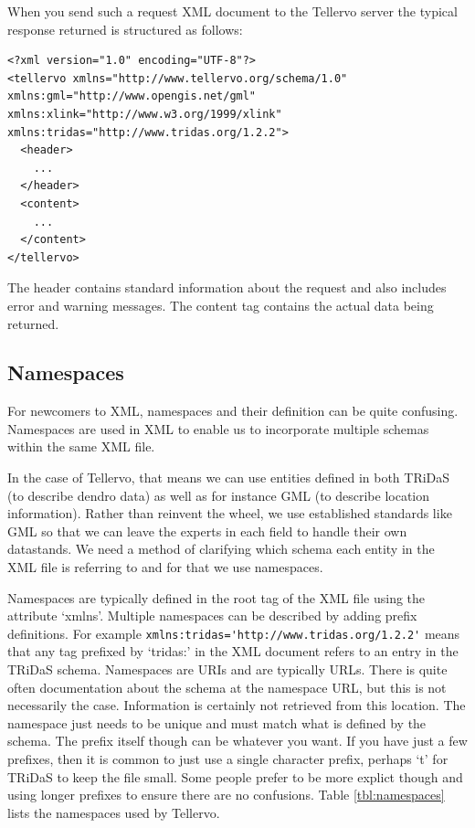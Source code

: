 When you send such a request XML document to the Tellervo server the typical response returned is structured as follows:

\begin{lstlisting}
<?xml version="1.0" encoding="UTF-8"?>
<tellervo xmlns="http://www.tellervo.org/schema/1.0" xmlns:gml="http://www.opengis.net/gml" xmlns:xlink="http://www.w3.org/1999/xlink" xmlns:tridas="http://www.tridas.org/1.2.2">
  <header>
    ...
  </header>
  <content>
    ...
  </content>
</tellervo>
\end{lstlisting}

The header contains standard information about the request and also includes error and warning messages.  The content tag contains the actual data being returned.

\subsection{Namespaces}
\label{txt:Namespaces}

For newcomers to XML, namespaces and their definition can be quite confusing. Namespaces are used in XML to enable us to incorporate multiple schemas within the same XML file.  

In the case of Tellervo, that means we can use entities defined in both TRiDaS (to describe dendro data) as well as for instance GML (to describe location information).  Rather than reinvent the wheel, we use established standards like GML so that we can leave the experts in each field to handle their own datastands.  We need a method of clarifying which schema each entity in the XML file is referring to and for that we use namespaces.  

Namespaces are typically defined in the root tag of the XML file using the attribute `xmlns'.  Multiple namespaces can be described by adding prefix definitions.  For example \lstinline$xmlns:tridas='http://www.tridas.org/1.2.2'$ means that any tag prefixed by `tridas:' in the XML document refers to an entry in the TRiDaS schema.  Namespaces are URIs and are typically URLs.  There is quite often documentation about the schema at the namespace URL, but this is not necessarily the case.  Information is certainly not retrieved from this location.  The namespace just needs to be unique and must match what is defined by the schema.  The prefix itself though can be whatever you want.  If you have just a few prefixes, then it is common to just use a single character prefix, perhaps `t' for TRiDaS to keep the file small.  Some people prefer to be more explict though and using longer prefixes to ensure there are no confusions.  Table \ref{tbl:namespaces} lists the namespaces used by Tellervo.


